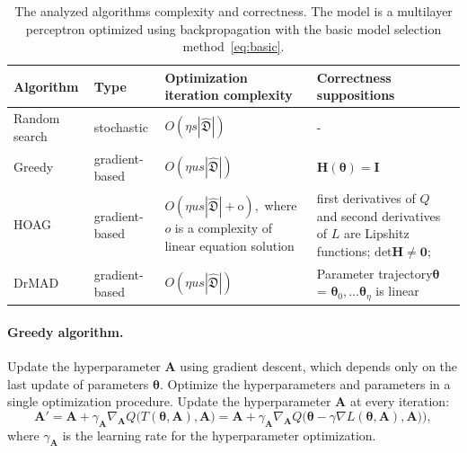 \documentclass[smallcondensed]{svjour3}
\begin{document}
\begin{table}
\small


\begin{tabularx}{\textwidth}{|X|X|X|X|}
\hline
\bf Algorithm & \bf Type & \bf Optimization iteration complexity & \bf Correctness suppositions  \\ 
\hline
Random search & stochastic & $O(\eta s |\hat{\mathfrak{D}}|)$& -  \\ \hline
Greedy~\cite{hyper_greed} & gradient-based & $O(\eta us |\hat{\mathfrak{D}}|)$ & $\mathbf{H}(\boldsymbol{\theta}) = \mathbf{I}$  \\ \hline
HOAG~\cite{hyper_hoag} & gradient-based & $O(\eta us |\hat{\mathfrak{D}}| + \text{o}),$ where $o$ is a complexity of linear equation solution& first derivatives of $Q$  and second derivatives of $L$ are Lipshitz functions;  $\text{det}\mathbf{H} \neq \mathbf{0}$;  \\ \hline
DrMAD~\cite{hyper_mad} & gradient-based &$O(\eta us |\hat{\mathfrak{D}}|)$ & Parameter trajectory$\boldsymbol{\theta}$ = $\boldsymbol{\theta}_0, \dots \boldsymbol{\theta}_\eta$  is linear \\ \hline
\end{tabularx}

\caption{The analyzed algorithms complexity and correctness. The model is a multilayer perceptron optimized using backpropagation with the basic model selection method~\eqref{eq:basic}.}
\label{table:algo_descr2}

\end{table}


\paragraph{Greedy algorithm.}
Update the hyperparameter $\mathbf{A}$ using gradient descent, which depends only on the last update of parameters $\boldsymbol{\theta}$. Optimize the hyperparameters and parameters in a single optimization procedure. Update the hyperparameter $\mathbf{A}$ at every iteration:
\[
	\mathbf{A}' = \mathbf{A} + \gamma_{\mathbf{A}} \nabla_{\mathbf{A}}  Q \bigl(T(\boldsymbol{\theta}, \mathbf{A}) , \mathbf{A}\bigr) = \mathbf{A} + \gamma_{\mathbf{A}} \nabla_{\mathbf{A}}  Q\bigl(\boldsymbol{\theta} - \gamma \nabla L(\boldsymbol{\theta}, \mathbf{A}), \mathbf{A})\bigr),
\]
where $\gamma_{\mathbf{A}}$ is the learning rate for the hyperparameter optimization.
\end{document}
